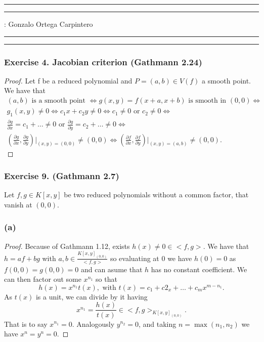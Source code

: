 \documentclass[11pt,a4paper]{article}
\begin{document}
\hrule\hrule
\vspace{1mm}


\vspace{1mm}

 : Gonzalo Ortega Carpintero
\vspace{2mm}

\hrule\hrule

\subsubsection*{\bf Exercise 4. Jacobian criterion (Gathmann 2.24)}
\begin{proof}
  Let f be a reduced polynomial and $ P = (a,b) \in V(f) $ a smooth point. We have that
  \begin{gather*}
    (a, b) \text{ is a smooth point } \Leftrightarrow g(x,y) = f(x+a, x+b) \text{ is smooth in } (0,0) \Leftrightarrow \\
    g_1(x,y) \neq 0 \Leftrightarrow c_1x + c_2y \neq 0 \Leftrightarrow c_1 \neq 0 \text{ or } c_2 \neq 0 \Leftrightarrow \\
    \frac{\partial g}{\partial x} = c_1 + \dots \neq 0 \text{ or } \frac{\partial g}{\partial y} = c_2 + \dots \neq 0 \Leftrightarrow \\
    \left(\frac{\partial g}{\partial x}, \frac{\partial g}{\partial y}\right)\Bigg|_{(x,y)=(0,0)} \neq (0,0) \Leftrightarrow \left(\frac{\partial f}{\partial x}, \frac{\partial f}{\partial y}\right)\Bigg|_{(x,y)=(a,b)} \neq (0,0).
  \end{gather*}
\end{proof}

\subsubsection*{\bf Exercise 9. (Gathmann 2.7)}
Let $ f, g \in K[x,y] $ be two reduced polynomials without a common factor, that vanish at $ (0,0) $.

\subsubsection*{\bf (a)}
\begin{proof} 
  Because of Gathmann 1.12, exists $ h(x) \neq 0 \in <f, g>$. We have that $ h = af + bg $ with $ a,b \in \frac{K[x,y]_{(0,0)}}{<f,g>} $ so evaluating at $ 0 $ we have $ h(0) = 0 $ as $ f(0,0) = g (0,0) = 0 $ and can asume that $ h $ has no constant coefficient. We can then factor out some $x^{n_1} $ so that
  $$
    h(x) = x^{n_1} t(x), \text{ with } t(x) = c_1 + c2_x + \dots + c_m x^{m-n_1}.
  $$
  As $ t(x)$ is a unit, we can divide by it having
  $$
    x^{n_1} = \frac{h(x)}{t(x)} \in <f, g>_{K[x, y]_{(0,0)}}.
  $$
  That is to say $ x^{n_1} = 0 $. Analogously $ y^{n_2} = 0 $, and taking $ n= \operatorname{max}(n_1, n_2) $ we have $ x^n = y^n = 0 $.

\end{proof}
\end{document}
